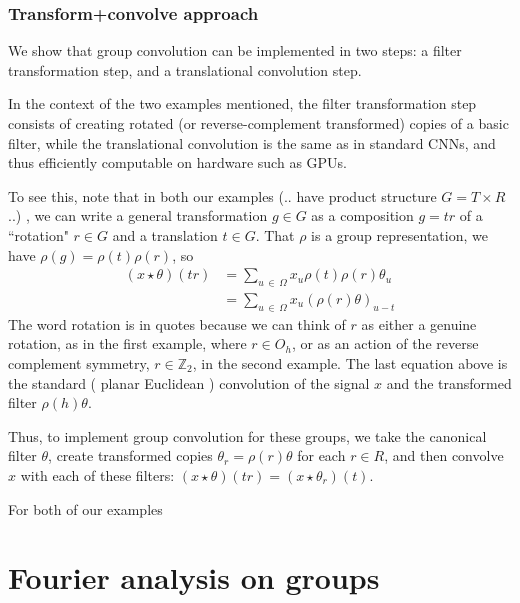 \documentclass[12pt]{article}
\numberwithin{equation}{section}
\theoremstyle{definition}
\newcommand{		\eq		}[1]	{	\begin{align*}#1\end{align*}	}%
\newcommand{		\Oh		}	{	\Omega					}
\newcommand{		\1		}	{	\bm{1}					}%
\begin{document}
\subsubsection*{Transform+convolve approach} 

We show that group convolution can be implemented in two steps: a filter transformation step, and a translational convolution step. 

In the context of the two examples mentioned, the filter transformation step consists of creating rotated (or reverse-complement transformed) copies of a basic filter, while the translational convolution is the same as in standard CNNs, and thus efficiently computable on hardware such as GPUs. 

To see this, note that in both our examples (.. have product structure $G = T \times R$ ..) , we can write a general transformation $g \in G$ as a composition $g = tr$ of a ``rotation" $r \in G$ and a translation $t \in G$. That $\rho$ is a group representation, we have $\rho(g) = \rho(t) \rho(r)$, so
\eq{
( x \star \theta ) (tr ) &= \sum_{ u \, \in \, \Oh } x_u \rho(t) \rho(r) \theta_u \\
&=  \sum_{u \, \in \, \Oh } x_u ( \rho(r) \theta) _{u-t} 
}
The word rotation is in quotes because we can think of $r$ as either a genuine rotation, as in the first example, where $r \in O_h$, or as an action of the reverse complement symmetry, $r \in \mathbb{Z}_2$, in the second example. The last equation above is the standard ( planar Euclidean ) convolution of the signal $x$ and the transformed filter $\rho(h) \theta$. 

\vspace{5mm}

\begin{mdframed}
Thus, to implement group convolution for these groups, we take the canonical filter $\theta$, create transformed copies $\theta_r = \rho(r) \theta$ for each $r \in R$, and then convolve $x$ with each of these filters: $(x \star \theta)(tr) = (x \star \theta_r) (t)$.

For both of our examples 
\end{mdframed}

\vspace{5mm}

\newpage 

\section{Fourier analysis on groups}
\end{document}
